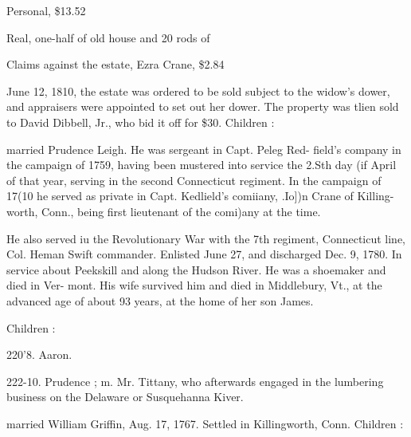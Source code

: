 \documentclass[oneside]{book}
\begin{document}
Personal, \$13.52 

Real, one-half of old house and 20 rods of 



Claims against the estate, Ezra Crane, \$2.84 

June 12, 1810, the estate was ordered to be sold subject to the 
widow's dower, and appraisers were appointed to set out her 
dower. The property was tlien sold to David Dibbell, Jr., who 
bid it off for \$30. Children : 









married Prudence Leigh. He was sergeant in Capt. Peleg Red- 
field's company in the campaign of 1759, having been mustered 
into service the 2.Sth day (if April of that year, serving in the 
second Connecticut regiment. In the campaign of 17(10 he served 
as private in Capt. Kedlield's comiiany, .Io])n Crane of Killing- 
worth, Conn., being first lieutenant of the comi)any at the time. 




He also served iu the Revolutionary War with the 7th regiment, 
Connecticut line, Col. Heman Swift commander. Enlisted June 
27, and discharged Dec. 9, 1780. In service about Peekskill and 
along the Hudson River. He was a shoemaker and died in Ver- 
mont. His wife survived him and died in Middlebury, Vt., at 
the advanced age of about 93 years, at the home of her son James. 

Children : 








220'8. Aaron. 


222-10. Prudence ; m. Mr. Tittany, who afterwards engaged in the 
lumbering business on the Delaware or Susquehanna Kiver. 


married William Griffin, Aug. 17, 1767. Settled in Killingworth, 
Conn. Children : 
\end{document}
